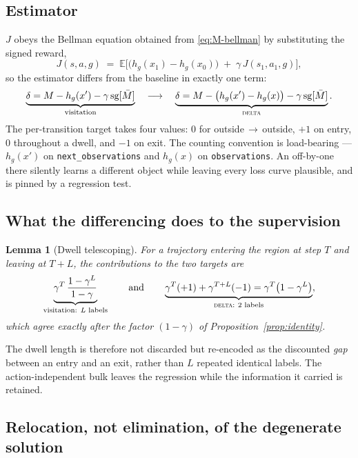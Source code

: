 \documentclass{article}
\newtheorem{lemma}{Lemma}
\providecommand{\E}{\mathbb{E}}
\newcommand{\sg}{\mathrm{sg}}
\begin{document}
\subsection{Estimator}

$J$ obeys the Bellman equation obtained from \eqref{eq:M-bellman} by
substituting the signed reward,
\begin{equation}
J(s,a,g) \;=\; \E\big[\big(h_g(x_1)-h_g(x_0)\big) \;+\; \gamma\,J(s_1,a_1,g)\big],
\label{eq:J-bellman}
\end{equation}
so the estimator differs from the baseline in exactly one term:
\begin{equation}
\underbrace{\delta = M - h_g(x') - \gamma\,\sg[\bar M]}_{\text{visitation}}
\quad\longrightarrow\quad
\underbrace{\delta = M - \big(h_g(x') - h_g(x)\big) - \gamma\,\sg[\bar M]}_{\textsc{delta}} .
\label{eq:residual}
\end{equation}
The per-transition target takes four values: $0$ for outside$\,\to\,$outside,
$+1$ on entry, $0$ throughout a dwell, and $-1$ on exit. The counting convention
is load-bearing --- $h_g(x')$ on \texttt{next\_observations} and $h_g(x)$ on
\texttt{observations}. An off-by-one there silently learns a different object
while leaving every loss curve plausible, and is pinned by a regression test.

\subsection{What the differencing does to the supervision}

\begin{lemma}[Dwell telescoping]
\label{lem:telescope}
For a trajectory entering the region at step $T$ and leaving at $T+L$, the
contributions to the two targets are
\[
\underbrace{\gamma^{T}\,\frac{1-\gamma^{L}}{1-\gamma}}_{\text{visitation: }L\text{ labels}}
\qquad\text{and}\qquad
\underbrace{\gamma^{T}(+1)+\gamma^{T+L}(-1)=\gamma^{T}\big(1-\gamma^{L}\big)}_{\textsc{delta}:\ 2\text{ labels}},
\]
which agree exactly after the factor $(1-\gamma)$ of
Proposition~\ref{prop:identity}.
\end{lemma}

The dwell length is therefore not discarded but re-encoded as the discounted
\emph{gap} between an entry and an exit, rather than $L$ repeated identical
labels. The action-independent bulk leaves the regression while the information
it carried is retained.

\subsection{Relocation, not elimination, of the degenerate solution}
\end{document}
